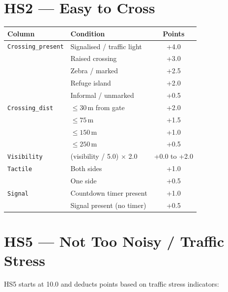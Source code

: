 \documentclass[11pt,a4paper,openany]{book}
\begin{document}
\section*{HS2 --- Easy to Cross}

\begin{center}
\begin{tabular}{lL{7cm}c}
\toprule
Column & Condition & Points \\
\midrule
\texttt{Crossing\_present} & Signalised / traffic light & +4.0 \\
                            & Raised crossing            & +3.0 \\
                            & Zebra / marked             & +2.5 \\
                            & Refuge island              & +2.0 \\
                            & Informal / unmarked        & +0.5 \\
\texttt{Crossing\_dist}    & $\le 30$\,m from gate      & +2.0 \\
                            & $\le 75$\,m               & +1.5 \\
                            & $\le 150$\,m              & +1.0 \\
                            & $\le 250$\,m              & +0.5 \\
\texttt{Visibility}         & (visibility / 5.0) $\times$ 2.0 & +0.0 to +2.0 \\
\texttt{Tactile}            & Both sides                 & +1.0 \\
                            & One side                  & +0.5 \\
\texttt{Signal}             & Countdown timer present   & +1.0 \\
                            & Signal present (no timer) & +0.5 \\
\bottomrule
\end{tabular}
\end{center}

\section*{HS5 --- Not Too Noisy / Traffic Stress}

HS5 starts at 10.0 and deducts points based on traffic stress indicators:
\end{document}
